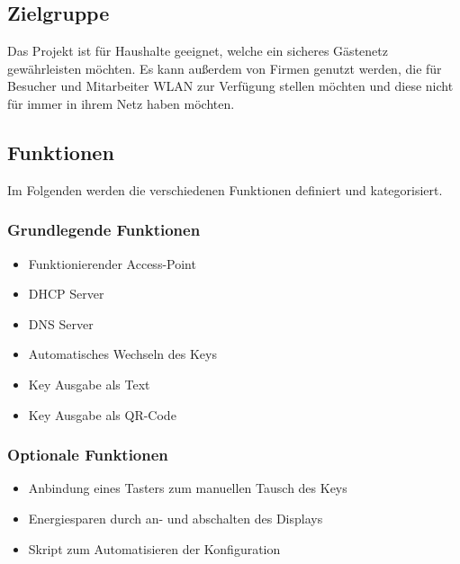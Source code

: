 \documentclass[a4paper,11pt,singlespacing]{article}
\begin{document}
		\subsection{Zielgruppe}
		Das Projekt ist für Haushalte geeignet, welche ein sicheres Gästenetz gewährleisten möchten. Es kann außerdem von Firmen genutzt werden, die für Besucher und Mitarbeiter WLAN zur Verfügung stellen möchten und diese nicht für immer in ihrem Netz haben möchten. 
		
		\subsection{Funktionen}
		Im Folgenden werden die verschiedenen Funktionen definiert und kategorisiert.
			\subsubsection{Grundlegende Funktionen}
			\begin{itemize}
				\item Funktionierender Access-Point
				\item DHCP Server
				\item DNS Server
				\item Automatisches Wechseln des Keys
				\item Key Ausgabe als Text
				\item Key Ausgabe als QR-Code
			\end{itemize}
		
			\subsubsection{Optionale Funktionen}
			\begin{itemize}
				\item Anbindung eines Tasters zum manuellen Tausch des Keys 
				\item Energiesparen durch an- und abschalten des Displays
				\item Skript zum Automatisieren der Konfiguration
			\end{itemize}
			
			
			
\end{document}

